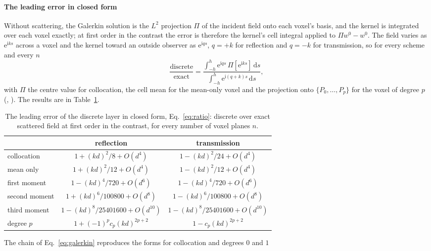 \documentclass[preprint,review,12pt]{elsarticle}
\newcommand{\dd}{\mathrm{d}}
\begin{document}
\paragraph{The leading error in closed form} Without scattering, the Galerkin solution is the
$L^2$ projection $\Pi$ of the incident field onto each voxel's basis, and the kernel is integrated
over each voxel exactly; at first order in the contrast the error is therefore the kernel's cell
integral applied to $\Pi w^0-w^0$. The field varies as $\mathrm{e}^{\mathrm{i}ks}$ across a voxel and the kernel toward
an outside observer as $\mathrm{e}^{\mathrm{i}qs}$, $q=+k$ for reflection and $q=-k$ for transmission, so for every
scheme and every $n$
\begin{equation}\label{eq:ratio}
  \frac{\text{discrete}}{\text{exact}}
  =\frac{\int_{-h}^{h}\mathrm{e}^{\mathrm{i}qs}\,\Pi[\mathrm{e}^{\mathrm{i}ks}]\,\dd s}{\int_{-h}^{h}\mathrm{e}^{\mathrm{i}(q+k)s}\,\dd s},
\end{equation}
with $\Pi$ the centre value for collocation, the cell mean for the mean-only voxel and the projection
onto $\{P_0,\dots,P_p\}$ for the voxel of degree $p$ (,
). The results are in Table~\ref{tab:ratio}.
\begin{table}[htbp]
\centering
\caption{The leading error of the discrete layer in closed form, Eq.~\eqref{eq:ratio}: discrete over exact scattered field at first order in the contrast, for every number of voxel planes $n$.}\label{tab:ratio}
\begin{tabular}{@{}lcc@{}}
\toprule
 & reflection & transmission \\
\midrule
collocation      & $1+(kd)^2/8+O(d^4)$  & $1-(kd)^2/24+O(d^4)$ \\
mean only        & $1+(kd)^2/12+O(d^4)$ & $1-(kd)^2/12+O(d^4)$ \\
first moment     & $1-(kd)^4/720+O(d^6)$ & $1-(kd)^4/720+O(d^6)$ \\
second moment    & $1+(kd)^6/100800+O(d^8)$ & $1-(kd)^6/100800+O(d^8)$ \\
third moment     & $1-(kd)^8/25401600+O(d^{10})$ & $1-(kd)^8/25401600+O(d^{10})$ \\
degree $p$       & $1+(-1)^pc_p(kd)^{2p+2}$ & $1-c_p(kd)^{2p+2}$ \\
\bottomrule
\end{tabular}
\end{table}
The chain of Eq.~\eqref{eq:galerkin} reproduces the forms for collocation and degrees $0$ and $1$
\end{document}

